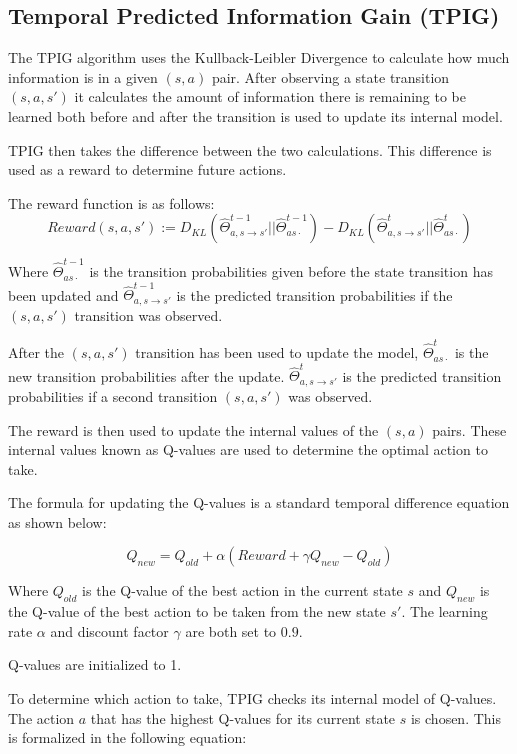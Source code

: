 \documentclass[12pt]{thesis}
\begin{document}
\subsection{Temporal Predicted Information Gain (TPIG)}
The TPIG algorithm uses the Kullback-Leibler Divergence to calculate how much information is in a given $(s,a)$ pair. After observing a state transition $(s,a,s')$ it calculates the amount of information there is remaining to be learned both before and after the transition is used to update its internal model.

TPIG then takes the difference between the two calculations. This difference is used as a reward to determine future actions.

The reward function is as follows:
\begin{equation}
	Reward(s,a,s') := D_{KL}(\hat{\Theta}_{a,s \rightarrow s'}^{t-1} || \hat{\Theta}_{as\cdot}^{t-1}) - D_{KL}(\hat{\Theta}_{a,s \rightarrow s'}^{t} || \hat{\Theta}_{as\cdot}^{t})
\label{eq:TPIGReward}
\end{equation}

Where $\hat{\Theta}_{as\cdot}^{t-1}$ is the transition probabilities given before the state transition has been updated and $\hat{\Theta}_{a,s \rightarrow s'}^{t-1}$ is the predicted transition probabilities if the $(s,a,s')$ transition was observed.

After the $(s,a,s')$ transition has been used to update the model, $\hat{\Theta}_{as\cdot}^{t}$ is the new transition probabilities after the update. $\hat{\Theta}_{a,s \rightarrow s'}^{t}$ is the predicted transition probabilities if a second transition $(s,a,s')$ was observed.

The reward is then used to update the internal values of the $(s,a)$ pairs. These internal values known as Q-values are used to determine the optimal action to take.

The formula for updating the Q-values is a standard temporal difference equation as shown below:

\[Q_{new} = Q_{old} + \alpha(Reward + \gamma Q_{new} - Q_{old})\]

Where $Q_{old}$ is the Q-value of the best action in the current state $s$ and $Q_{new}$ is the Q-value of the best action to be taken from the new state $s'$. The learning rate $\alpha$ and discount factor $\gamma$ are both set to $0.9$.

Q-values are initialized to 1.

To determine which action to take, TPIG checks its internal model of Q-values. The action $a$ that has the highest Q-values for its current state $s$ is chosen. This is formalized in the following equation:
\end{document}
